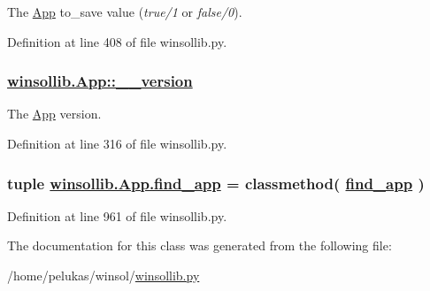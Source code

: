 The \hyperlink{classwinsollib_1_1App}{App} to\_\-save value ({\em true/1\/} or {\em false/0\/}). 



Definition at line 408 of file winsollib.py.\hypertarget{classwinsollib_1_1App_4276b8c90e4fdf69f92dfb05893b12fa}{
\subsubsection[\_\-\_\-version]{\setlength{\rightskip}{0pt plus 5cm}\hyperlink{classwinsollib_1_1App_4276b8c90e4fdf69f92dfb05893b12fa}{winsollib.App::\_\-\_\-version}}}
\label{classwinsollib_1_1App_4276b8c90e4fdf69f92dfb05893b12fa}


The \hyperlink{classwinsollib_1_1App}{App} version. 



Definition at line 316 of file winsollib.py.\hypertarget{classwinsollib_1_1App_8781b002b53dc32d0d780fa72069def8}{
\subsubsection[find\_\-app]{\setlength{\rightskip}{0pt plus 5cm}tuple \hyperlink{classwinsollib_1_1App_8781b002b53dc32d0d780fa72069def8}{winsollib.App.find\_\-app} = classmethod( \hyperlink{classwinsollib_1_1App_8781b002b53dc32d0d780fa72069def8}{find\_\-app} )}}
\label{classwinsollib_1_1App_8781b002b53dc32d0d780fa72069def8}




Definition at line 961 of file winsollib.py.

The documentation for this class was generated from the following file:\begin{CompactItemize}
\item 
/home/pelukas/winsol/\hyperlink{winsollib_8py}{winsollib.py}\end{CompactItemize}
